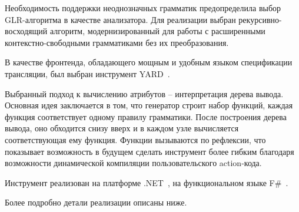 
Необходимость поддержки неоднозначных грамматик предопределила выбор GLR-алгоритма в качестве анализатора. Для реализации выбран рекурсивно-восходящий алгоритм, модернизированный для работы с расширенными контекстно-свободными грамматиками без их преобразования.

В качестве фронтенда, обладающего мощным и удобным языком спецификации трансляции, был выбран инструмент YARD~\cite{Diploma}.%

Выбранный подход к вычислению атрибутов -- интерпретация дерева вывода. Основная идея заключается в том, что генератор строит набор функций, каждая функция соответствует одному правилу грамматики. После построения дерева вывода, оно обходится снизу вверх и в каждом узле вычисляется соответствующая ему функция. Функции вызываются по рефлексии, что показывает возможность в будущем сделать инструмент более гибким благодаря возможности динамической компиляции пользовательского action-кода.

Инструмент реализован на платформе .NET~\cite{.NET}, на функциональном языке F\#~\cite{FS}.

Более подробно детали реализации описаны ниже.
